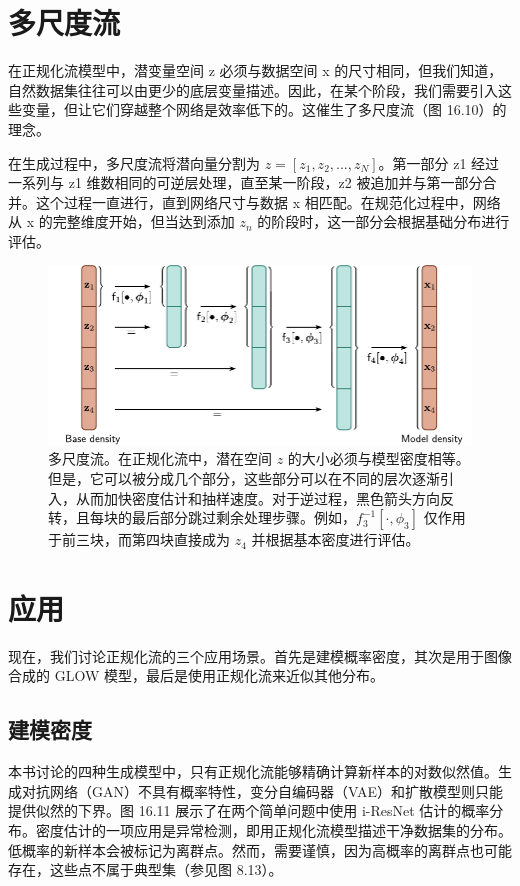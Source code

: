 \documentclass[lang=cn,newtx,10pt,scheme=chinese]{elegantbook}
\begin{document}
\section{多尺度流}
在正规化流模型中，潜变量空间 z 必须与数据空间 x 的尺寸相同，但我们知道，自然数据集往往可以由更少的底层变量描述。因此，在某个阶段，我们需要引入这些变量，但让它们穿越整个网络是效率低下的。这催生了多尺度流（图 16.10）的理念。

在生成过程中，多尺度流将潜向量分割为 \(z = [z_1,z_2,...,z_N]\)。第一部分 z1 经过一系列与 z1 维数相同的可逆层处理，直至某一阶段，z2 被追加并与第一部分合并。这个过程一直进行，直到网络尺寸与数据 x 相匹配。在规范化过程中，网络从 x 的完整维度开始，但当达到添加 \(z_n\) 的阶段时，这一部分会根据基础分布进行评估。

\begin{figure}[ht!]
\centering
\includegraphics[width=0.7\linewidth]{PDFFigures/UDLChap16PDF/FlowMultiscale.pdf}
\caption{多尺度流。在正规化流中，潜在空间 \( z \) 的大小必须与模型密度相等。但是，它可以被分成几个部分，这些部分可以在不同的层次逐渐引入，从而加快密度估计和抽样速度。对于逆过程，黑色箭头方向反转，且每块的最后部分跳过剩余处理步骤。例如，\( f^{-1}_3[\cdot, \phi_3] \) 仅作用于前三块，而第四块直接成为 \( z_4 \) 并根据基本密度进行评估。}
\end{figure}


\section{应用}
现在，我们讨论正规化流的三个应用场景。首先是建模概率密度，其次是用于图像合成的 GLOW 模型，最后是使用正规化流来近似其他分布。

\subsection{建模密度}

本书讨论的四种生成模型中，只有正规化流能够精确计算新样本的对数似然值。生成对抗网络（GAN）不具有概率特性，变分自编码器（VAE）和扩散模型则只能提供似然的下界。图 16.11 展示了在两个简单问题中使用 i-ResNet 估计的概率分布。密度估计的一项应用是异常检测，即用正规化流模型描述干净数据集的分布。低概率的新样本会被标记为离群点。然而，需要谨慎，因为高概率的离群点也可能存在，这些点不属于典型集（参见图 8.13）。
\end{document}
